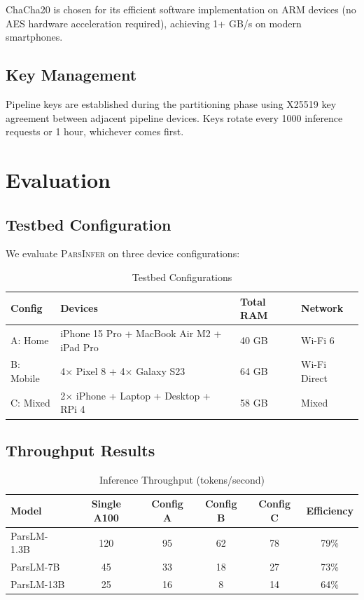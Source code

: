 \documentclass[11pt,a4paper]{article}
\newcommand{\parsdi}{\textsc{ParsInfer}\xspace}
\begin{document}
ChaCha20 is chosen for its efficient software implementation on ARM devices (no AES hardware acceleration required), achieving 1+ GB/s on modern smartphones.

\subsection{Key Management}

Pipeline keys are established during the partitioning phase using X25519 key agreement between adjacent pipeline devices. Keys rotate every 1000 inference requests or 1 hour, whichever comes first.

\section{Evaluation}

\subsection{Testbed Configuration}

We evaluate \parsdi on three device configurations:

\begin{table}[H]
\centering
\caption{Testbed Configurations}
\label{tab:testbed}
\begin{tabular}{llll}
\toprule
\textbf{Config} & \textbf{Devices} & \textbf{Total RAM} & \textbf{Network} \\
\midrule
A: Home & iPhone 15 Pro + MacBook Air M2 + iPad Pro & 40 GB & Wi-Fi 6 \\
B: Mobile & 4$\times$ Pixel 8 + 4$\times$ Galaxy S23 & 64 GB & Wi-Fi Direct \\
C: Mixed & 2$\times$ iPhone + Laptop + Desktop + RPi 4 & 58 GB & Mixed \\
\bottomrule
\end{tabular}
\end{table}

\subsection{Throughput Results}

\begin{table}[H]
\centering
\caption{Inference Throughput (tokens/second)}
\label{tab:throughput}
\begin{tabular}{lccccc}
\toprule
\textbf{Model} & \textbf{Single A100} & \textbf{Config A} & \textbf{Config B} & \textbf{Config C} & \textbf{Efficiency} \\
\midrule
ParsLM-1.3B & 120 & 95 & 62 & 78 & 79\% \\
ParsLM-7B & 45 & 33 & 18 & 27 & 73\% \\
ParsLM-13B & 25 & 16 & 8 & 14 & 64\% \\
\bottomrule
\end{tabular}
\end{table}
\end{document}
